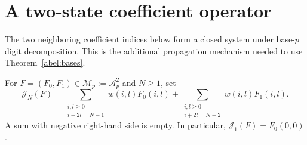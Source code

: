 \documentclass[11pt,a4paper]{article}
\theoremstyle{remark}\newtheorem{remark}[theorem]{Remark}
\begin{document}
\section{A two-state coefficient operator}
\label{sec:two-state}

The two neighboring coefficient indices below form a closed system under
base-\(p\) digit decomposition. This is the additional propagation mechanism
needed to use Theorem~\ref{abel:bases}.

For \(F=(F_0,F_1)\in\mathcal M_p:=\mathcal A_p^2\) and \(N\ge1\), set
\begin{equation}\label{state:functional}
 \mathcal J_N(F)=
 \sum_{\substack{i,l\ge0\\i+2l=N-1}}w(i,l)F_0(i,l)
 +\sum_{\substack{i,l\ge0\\i+2l=N-2}}w(i,l)F_1(i,l).
\end{equation}
A sum with negative right-hand side is empty. In particular,
\(\mathcal J_1(F)=F_0(0,0)\).
\end{document}
